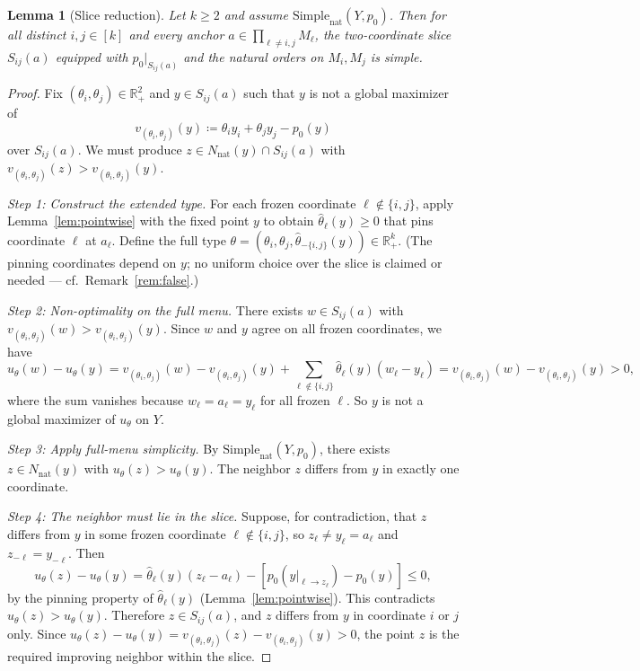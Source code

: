 \documentclass[11pt]{article}
\newtheorem{lemma}[theorem]{Lemma}
\newcommand{\R}{\mathbb{R}}
\newcommand{\Rp}{\R_+}
\newcommand{\Simplenat}{\mathrm{Simple}_{\mathrm{nat}}}
\begin{document}
\begin{lemma}[Slice reduction]\label{lem:slice}
Let $k \geq 2$ and assume $\Simplenat(Y, p_0)$.
Then for all distinct $i, j \in [k]$ and every anchor $a \in \prod_{\ell \neq i,j} M_\ell$,
the two-coordinate slice $S_{ij}(a)$ equipped with $p_0|_{S_{ij}(a)}$ and the
natural orders on $M_i, M_j$ is simple.
\end{lemma}

\begin{proof}
Fix $(\theta_i, \theta_j) \in \Rp^2$ and $y \in S_{ij}(a)$ such that $y$ is not
a global maximizer of
\[
  v_{(\theta_i,\theta_j)}(y) \coloneqq \theta_i y_i + \theta_j y_j - p_0(y)
\]
over $S_{ij}(a)$.  We must produce $z \in N_{\mathrm{nat}}(y) \cap S_{ij}(a)$
with $v_{(\theta_i,\theta_j)}(z) > v_{(\theta_i,\theta_j)}(y)$.

\emph{Step 1: Construct the extended type.}
For each frozen coordinate $\ell \notin \{i,j\}$,
apply Lemma~\ref{lem:pointwise} with the fixed point $y$ to obtain
$\hat\theta_\ell(y) \geq 0$ that pins coordinate $\ell$ at $a_\ell$.
Define the full type $\theta = (\theta_i, \theta_j, \hat\theta_{-\{i,j\}}(y)) \in \Rp^k$.
(The pinning coordinates depend on $y$; no uniform choice over the slice
is claimed or needed --- cf.\ Remark~\ref{rem:false}.)

\emph{Step 2: Non-optimality on the full menu.}
There exists $w \in S_{ij}(a)$ with $v_{(\theta_i,\theta_j)}(w) > v_{(\theta_i,\theta_j)}(y)$.
Since $w$ and $y$ agree on all frozen coordinates, we have
\[
  u_\theta(w) - u_\theta(y) = v_{(\theta_i,\theta_j)}(w) - v_{(\theta_i,\theta_j)}(y)
  + \sum_{\ell \notin \{i,j\}} \hat\theta_\ell(y)(w_\ell - y_\ell) = v_{(\theta_i,\theta_j)}(w) - v_{(\theta_i,\theta_j)}(y) > 0,
\]
where the sum vanishes because $w_\ell = a_\ell = y_\ell$ for all frozen $\ell$.
So $y$ is not a global maximizer of $u_\theta$ on $Y$.

\emph{Step 3: Apply full-menu simplicity.}
By $\Simplenat(Y, p_0)$, there exists $z \in N_{\mathrm{nat}}(y)$ with
$u_\theta(z) > u_\theta(y)$.
The neighbor $z$ differs from $y$ in exactly one coordinate.

\emph{Step 4: The neighbor must lie in the slice.}
Suppose, for contradiction, that $z$ differs from $y$ in some frozen
coordinate $\ell \notin \{i,j\}$, so $z_\ell \neq y_\ell = a_\ell$
and $z_{-\ell} = y_{-\ell}$.
Then
\[
  u_\theta(z) - u_\theta(y)
  = \hat\theta_\ell(y)(z_\ell - a_\ell) - [p_0(y|_{\ell \to z_\ell}) - p_0(y)] \leq 0,
\]
by the pinning property of $\hat\theta_\ell(y)$ (Lemma~\ref{lem:pointwise}).
This contradicts $u_\theta(z) > u_\theta(y)$.
Therefore $z \in S_{ij}(a)$, and $z$ differs from $y$ in coordinate $i$ or $j$ only.
Since $u_\theta(z) - u_\theta(y) = v_{(\theta_i,\theta_j)}(z) - v_{(\theta_i,\theta_j)}(y) > 0$,
the point $z$ is the required improving neighbor within the slice.
\end{proof}
\end{document}
